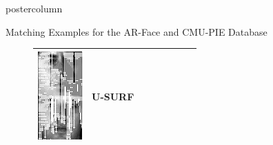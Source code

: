 \documentclass[final,hyperref={pdfpagelabels=false}]{beamer}
\begin{document}
\begin{frame}
\begin{columns}
\begin{column}{.49\textwidth}
\begin{beamercolorbox}[center,wd=\textwidth]{postercolumn}
\begin{minipage}[T]{.95\textwidth}
{\begin{block}{Matching Examples for the AR-Face and CMU-PIE Database}
\begin{figure}
\begin{tabular}{p{.09\linewidth} | p{.12\linewidth} | p{.12\linewidth} | p{.12\linewidth} || p{.12\linewidth} | p{.12\linewidth} | p{.12\linewidth} | p{.09\linewidth} }
                  \includegraphics[width=1.0\linewidth]{paper/bmvc09-surf/figures/matchings/cmupie-usurf/grid-best_07-27-22.pgm--07-27-08}
                  &
                  U-SURF
                  \\
                  \hline

\end{tabular}
\end{figure}
\end{block}}
\end{minipage}
\end{beamercolorbox}
\end{column}
\end{columns}
\end{frame}
\end{document}
